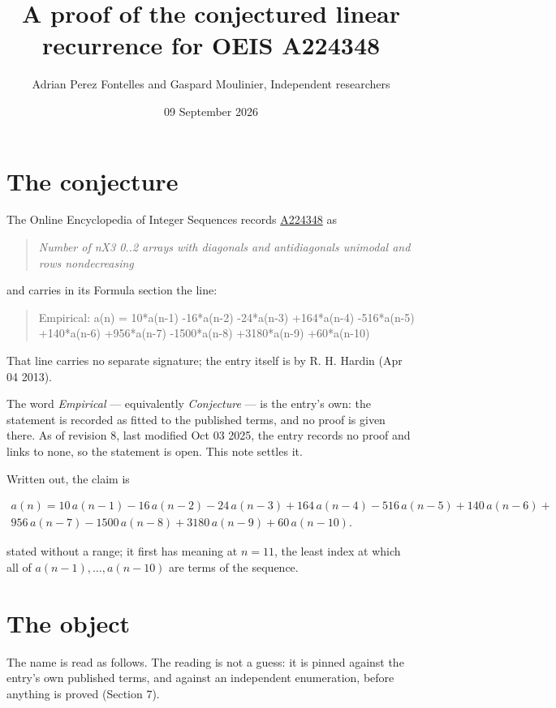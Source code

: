 \documentclass[11pt]{article}
\title{A proof of the conjectured linear recurrence for OEIS A224348}
\author{Adrian Perez Fontelles and Gaspard Moulinier, Independent researchers}
\date{09 September 2026}
\theoremstyle{definition}
\begin{document}
\maketitle
\section{The conjecture}

The Online Encyclopedia of Integer Sequences records \href{https://oeis.org/A224348}{A224348} as

\begin{quote}\itshape Number of nX3 0..2 arrays with diagonals and antidiagonals unimodal and rows nondecreasing\end{quote}

and carries in its Formula section the line:

\begin{quote}\ttfamily Empirical: a(n) = 10*a(n-1) -16*a(n-2) -24*a(n-3) +164*a(n-4) -516*a(n-5) +140*a(n-6) +956*a(n-7) -1500*a(n-8) +3180*a(n-9) +60*a(n-10)\end{quote}

That line carries no separate signature; the entry itself is by R. H. Hardin (Apr 04 2013).

The word {\itshape Empirical} --- equivalently {\itshape Conjecture} --- is the entry's own: the statement is recorded as fitted to the published terms, and no proof is given there. As of revision 8, last modified Oct 03 2025, the entry records no proof and links to none, so the statement is open. This note settles it.

Written out, the claim is

\begin{multline*} a(n) = 10\,a(n-1) - 16\,a(n-2) - 24\,a(n-3) + 164\,a(n-4) - 516\,a(n-5) + 140\,a(n-6) + \\ 956\,a(n-7) - 1500\,a(n-8) + 3180\,a(n-9) + 60\,a(n-10). \end{multline*}

stated without a range; it first has meaning at $n = 11$, the least index at which all of $a(n-1),\dots,a(n-10)$ are terms of the sequence.

\section{The object}

The name is read as follows. The reading is not a guess: it is pinned against the entry's own published terms, and against an independent enumeration, before anything is proved (Section 7).
\end{document}
